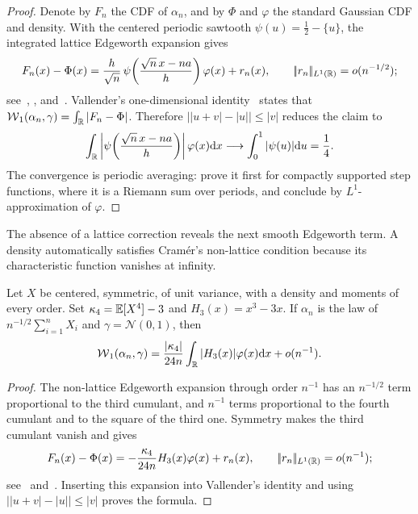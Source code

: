 \begin{proof}
	Denote by \(F_n\) the CDF of \(\alpha_n\), and by \(\Phi\) and \(\varphi\) the standard Gaussian CDF and density. With the centered periodic sawtooth \(\psi(u)=\frac12-\{u\}\), the integrated lattice Edgeworth expansion gives
	\[
		F_n(x)-\Phi(x)
		=
		\frac h{\sqrt n}\,
		\psi\!\left(\frac{\sqrt n\,x-na}{h}\right)\varphi(x)+r_n(x),
		\qquad
		|\!| r_n |\!|_{L^1(\mathbb{R})}=o(n^{-1/2});
	\]
	see~\cite[Chapter~VII]{Petrov1975}, \cite[Chapter~5]{BhattacharyaRao2010}, and~\cite{KolassaMcCullagh1990}. Vallender's one-dimensional identity~\cite{Vallender1974} states that \(\operatorname{\mathcal{W}}_1(\alpha_n,\gamma)=\int_{\mathbb{R}}|F_n-\Phi|\). Therefore \(\big||u+v|-|u|\big|\leq|v|\) reduces the claim to
	\[
		\int_{\mathbb{R}}
		\left|\psi\!\left(\frac{\sqrt n\,x-na}{h}\right)\right|
		\varphi(x)\mathrm{d} x
		\longrightarrow
		\int_0^1|\psi(u)|\mathrm{d} u
		=
		\frac14.
	\]
	The convergence is periodic averaging: prove it first for compactly supported step functions, where it is a Riemann sum over periods, and conclude by \(L^1\)-approximation of \(\varphi\).
\end{proof}

The absence of a lattice correction reveals the next smooth Edgeworth term. A density automatically satisfies Cram\'er's non-lattice condition because its characteristic function vanishes at infinity.

\begin{prop}\label{prop-sharp-density-w1-clt}
	Let \(X\) be centered, symmetric, of unit variance, with a density and moments of every order. Set \(\kappa_4=\mathbb{E}[X^4]-3\) and \(H_3(x)=x^3-3x\). If \(\alpha_n\) is the law of \(n^{-1/2}\sum_{i=1}^nX_i\) and \(\gamma=\mathcal N(0,1)\), then
	\[
		\operatorname{\mathcal{W}}_1(\alpha_n,\gamma)
		=
		\frac{|\kappa_4|}{24n}
		\int_{\mathbb{R}} |H_3(x)|\varphi(x)\mathrm{d} x
		+o(n^{-1}).
	\]
\end{prop}

\begin{proof}
	The non-lattice Edgeworth expansion through order \(n^{-1}\) has an \(n^{-1/2}\) term proportional to the third cumulant, and \(n^{-1}\) terms proportional to the fourth cumulant and to the square of the third one. Symmetry makes the third cumulant vanish and gives
	\[
		F_n(x)-\Phi(x)
		=-\frac{\kappa_4}{24n}H_3(x)\varphi(x)+r_n(x),
		\qquad
		|\!| r_n |\!|_{L^1(\mathbb{R})}=o(n^{-1});
	\]
	see~\cite[Chapter~VI]{Petrov1975} and~\cite[Chapter~4]{BhattacharyaRao2010}. Inserting this expansion into Vallender's identity and using \(\big||u+v|-|u|\big|\leq|v|\) proves the formula.
\end{proof}

